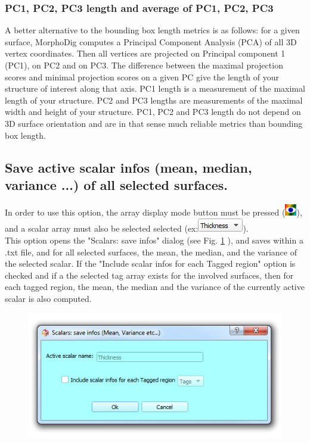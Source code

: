 \subsubsection{PC1, PC2, PC3 length and average of PC1, PC2, PC3}
A better alternative to the bounding box length metrics is as follows: for a given surface, MorphoDig computes a Principal Component Analysis (PCA) of all 3D vertex coordinates. Then all vertices are projected on Principal component 1 (PC1), on PC2 and on PC3. The difference between the maximal projection scores and minimal projection scores on a given PC give the length of your structure of interest along that axis. PC1 length is a measurement of the maximal length of your structure. PC2 and PC3 lengths are measurements of the maximal width and height of your structure. PC1, PC2 and PC3 length do not depend on 3D surface orientation and are in that sense much reliable metrics than bounding box length. 

\subsection{Save active scalar infos (mean, median, variance ...) of all selected surfaces.}
In order to use this option, the array display mode button must be pressed (\includegraphics[scale=0.7]{images/04/show_color_scale.png}), and a scalar array must also be selected selected (ex:\includegraphics[scale=0.5]{images/04/scalarcombo_scalar.png}).\\
This option opens the "Scalars: save infos" dialog (see Fig. \ref{active_scalar_infos} \pageref{active_scalar_infos}), and saves within a .txt file, and for all selected surfaces, the mean, the median, and the variance of the selected scalar. If the "Include scalar infos for each Tagged region" option is checked and if a the selected tag array exists for the involved surfaces, then for each tagged region, the mean, the median and the variance of the currently active scalar is also computed. 

\begin{figure}
  \centering  
 \includegraphics[scale=0.5]{images/07/measurements/active_scalar_infos.png}
\label{active_scalar_infos}
\end{figure}


